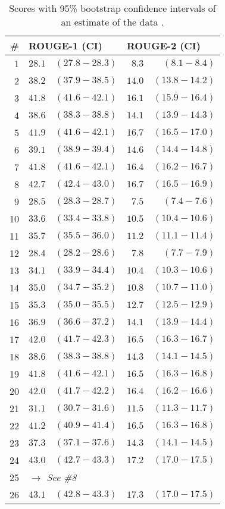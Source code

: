 \documentclass{article}
\begin{document}
\begin{table}[b]
    \caption{Scores with 95\% bootstrap confidence intervals of an estimate of the data \citep{doi:10.1113/jphysiol.2012.239376}.}
    \label{tab:bootstrap}
    \centering
    \begin{tabular}{rrrrr}
    \toprule
    \# & \multicolumn{2}{l}{ROUGE-1 (CI)} & \multicolumn{2}{l}{ROUGE-2 (CI)} \\
    \midrule
1 & $28.1$ & $(27.8-28.3)$ & $8.3$ & $(8.1-8.4)$ \\
    2 & $38.2$ & $(37.9-38.5)$ & $14.0$ & $(13.8-14.2)$ \\
    3 & $41.8$ & $(41.6-42.1)$ & $16.1$ & $(15.9-16.4)$ \\
    4 & $38.6$ & $(38.3-38.8)$ & $14.1$ & $(13.9-14.3)$ \\
    5 & $41.9$ & $(41.6-42.1)$ & $16.7$ & $(16.5-17.0)$ \\
    6 & $39.1$ & $(38.9-39.4)$ & $14.6$ & $(14.4-14.8)$ \\
    7 & $41.8$ & $(41.6-42.1)$ & $16.4$ & $(16.2-16.7)$ \\
    8 & $42.7$ & $(42.4-43.0)$ & $16.7$ & $(16.5-16.9)$ \\
9 & $28.5$ & $(28.3-28.7)$ & $7.5$ & $(7.4-7.6)$ \\
    10 & $33.6$ & $(33.4-33.8)$ & $10.5$ & $(10.4-10.6)$ \\
    11 & $35.7$ & $(35.5-36.0)$ & $11.2$ & $(11.1-11.4)$ \\
    12 & $28.4$ & $(28.2-28.6)$ & $7.8$ & $(7.7-7.9)$ \\
    13 & $34.1$ & $(33.9-34.4)$ & $10.4$ & $(10.3-10.6)$ \\
    14 & $35.0$ & $(34.7-35.2)$ & $10.8$ & $(10.7-11.0)$ \\
    15 & $35.3$ & $(35.0-35.5)$ & $12.7$ & $(12.5-12.9)$ \\
    16 & $36.9$ & $(36.6-37.2)$ & $14.1$ & $(13.9-14.4)$ \\
    17 & $42.0$ & $(41.7-42.3)$ & $16.5$ & $(16.3-16.7)$ \\
    18 & $38.6$ & $(38.3-38.8)$ & $14.3$ & $(14.1-14.5)$\\
    19 & $41.8$ & $(41.6-42.1)$ & $16.5$ & $(16.3-16.8)$\\
    20 & $42.0$ & $(41.7-42.2)$ & $16.4$ & $(16.2-16.6)$\\
    
    21 & $31.1$ & $(30.7-31.6)$ & $11.5$ & $(11.3-11.7)$ \\
    22 & $41.2$ & $(40.9-41.4)$ & $16.5$ & $(16.3-16.8)$ \\
    23 & $37.3$ & $(37.1-37.6)$ & $14.3$ & $(14.1-14.5)$ \\
    24 & $43.0$ & $(42.7-43.3)$ & $17.2$ & $(17.0-17.5)$ \\
    25 & \multicolumn{4}{l}{\textit{$\rightarrow$ See  \#8}} \\
    26 & $43.1$ & $(42.8-43.3)$ & $17.3$ & $(17.0-17.5)$ \\


\end{tabular}
\end{table}
\end{document}
